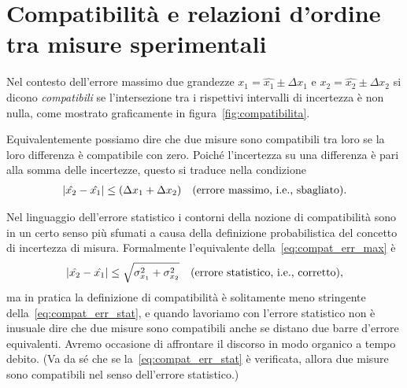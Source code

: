 \section{Compatibilità e relazioni d'ordine tra misure sperimentali}
\label{sec:compatibilita_err_max}

Nel contesto dell'errore massimo due grandezze $x_1 = \hat{x_1} \pm \Delta x_1$
e $x_2 = \hat{x_2} \pm \Delta x_2$ si dicono \emph{compatibili} se
l'intersezione tra i rispettivi intervalli di incertezza è non nulla, come
mostrato graficamente in figura~\ref{fig:compatibilita}.

\begin{figure}[htb!]
\end{figure}

Equivalentemente possiamo dire che due misure sono compatibili tra loro se la
loro differenza è compatibile con zero. Poiché l'incertezza su una
differenza è pari alla somma delle incertezze, questo si traduce nella
condizione
\begin{align}\label{eq:compat_err_max}
  \left| \hat{x_2} - \hat{x_1} \right| \leq (\Delta x_1 + \Delta x_2)
  \quad \text{(errore massimo, i.e., sbagliato)}.
\end{align}

Nel linguaggio dell'errore statistico i contorni della nozione di
compatibilità sono in un certo senso più sfumati a causa della definizione
probabilistica del concetto di incertezza di misura. Formalmente
l'equivalente della~\eqref{eq:compat_err_max} è
\begin{align}\label{eq:compat_err_stat}
  \left| \hat{x_2} - \hat{x_1} \right| \leq \sqrt{\sigma^2_{x_1} + \sigma^2_{x_2}}
  \quad \text{(errore statistico, i.e., corretto)},
\end{align}
ma in pratica la definizione di compatibilità è solitamente meno stringente
della~\eqref{eq:compat_err_stat}, e quando lavoriamo con l'errore statistico
non è inusuale dire che due misure sono compatibili anche se distano due barre
d'errore equivalenti. Avremo occasione di affrontare il discorso in modo
organico a tempo debito. (Va da sé che se la~\eqref{eq:compat_err_stat} è
verificata, allora due misure sono compatibili nel senso dell'errore
statistico.)

